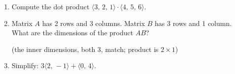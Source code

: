 \documentclass[10pt]{article}
\begin{document}
\namedateperiod

\vspace{0.15in}

\begin{enumerate}[leftmargin=1.6em, itemsep=18pt]

\item Compute the dot product $\langle 3,\, 2,\, 1\rangle \cdot \langle 4,\, 5,\, 6\rangle$.

\medskip
{}

\vspace{0.8in}

\item Matrix $A$ has 2 rows and 3 columns. Matrix $B$ has 3 rows and 1 column.
      What are the dimensions of the product $AB$?

\medskip
{} \quad (the inner dimensions, both 3, match; product is $2 \times 1$)

\vspace{0.6in}

\item Simplify: $3\langle 2,\,-1\rangle + \langle 0,\,4\rangle$.

\medskip
{}

\vspace{0.4in}

\end{enumerate}
\end{document}

